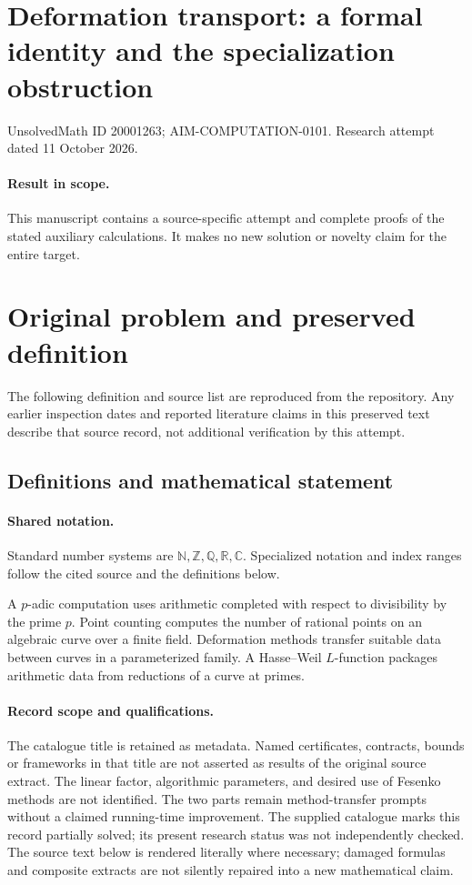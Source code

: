 \documentclass[11pt]{article}
\begin{document}
\section*{Deformation transport: a formal identity and the specialization obstruction}
\noindent UnsolvedMath ID 20001263; AIM-COMPUTATION-0101. Research attempt dated 11 October 2026.
\paragraph{Result in scope.}This manuscript contains a source-specific attempt and complete proofs of the stated auxiliary calculations. It makes no new solution or novelty claim for the entire target.
\section{Original problem and preserved definition}
The following definition and source list are reproduced from the repository. Any earlier inspection dates and reported literature claims in this preserved text describe that source record, not additional verification by this attempt.
\subsection{Definitions and mathematical statement}

\paragraph{Shared notation.}Standard number systems are $\mathbb N,\mathbb Z,\mathbb Q,\mathbb R,\mathbb C$. Specialized notation and index ranges follow the cited source and the definitions below.


A $p$-adic computation uses arithmetic completed with respect to divisibility by the prime $p$. Point counting computes the number of rational points on an algebraic curve over a finite field. Deformation methods transfer suitable data between curves in a parameterized family. A Hasse--Weil $L$-function packages arithmetic data from reductions of a curve at primes.
\paragraph{Record scope and qualifications.}
The catalogue title is retained as metadata. Named certificates, contracts, bounds or frameworks in that title are not asserted as results of the original source extract.
The linear factor, algorithmic parameters, and desired use of Fesenko methods are not identified. The two parts remain method-transfer prompts without a claimed running-time improvement. The supplied catalogue marks this record partially solved; its present research status was not independently checked.
The source text below is rendered literally where necessary; damaged formulas and composite extracts are not silently repaired into a new mathematical claim.
\end{document}
